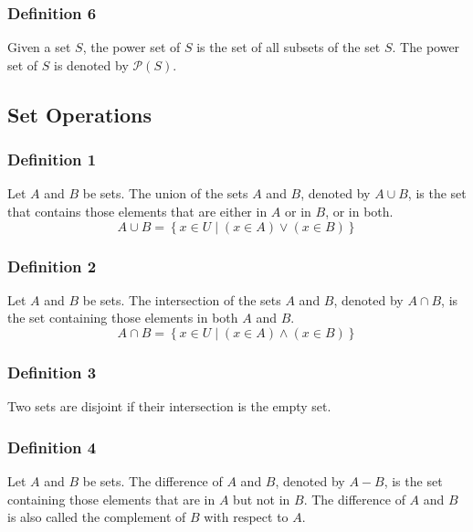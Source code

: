 \documentclass{article}
\begin{document}
\subsubsection{Definition 6}

Given a set $ S $, the power set of $ S $ is the set of all subsets of the set $ S $. The power set of $ S $ is denoted by $ \mathcal{P}(S) $.

\subsection{Set Operations}

\subsubsection{Definition 1}

Let $ A $ and $ B $ be sets. The union of the sets $ A $ and $ B $, denoted by $ A \cup B $, is the set that contains those elements that are either in $ A $ or in $ B $, or in both.
\begin{equation}
	A \cup B = \left\{ x \in U \mid ( x \in A ) \lor ( x \in B ) \right\}
\end{equation}

\subsubsection{Definition 2}

Let $ A $ and $ B $ be sets. The intersection of the sets $ A $ and $ B $, denoted by $ A \cap B $, is the set containing those elements in both $ A $ and $ B $.
\begin{equation}
	A \cap B = \left\{ x \in U \mid ( x \in A ) \land ( x \in B ) \right\}
\end{equation}

\subsubsection{Definition 3}

Two sets are disjoint if their intersection is the empty set.

\subsubsection{Definition 4}

Let $ A $ and $ B $ be sets. The difference of $ A $ and $ B $, denoted by $ A - B $, is the set containing those elements that are in $ A $ but not in $ B $. The difference of $ A $ and $ B $ is also called the complement of $ B $ with respect to $ A $.
\end{document}
